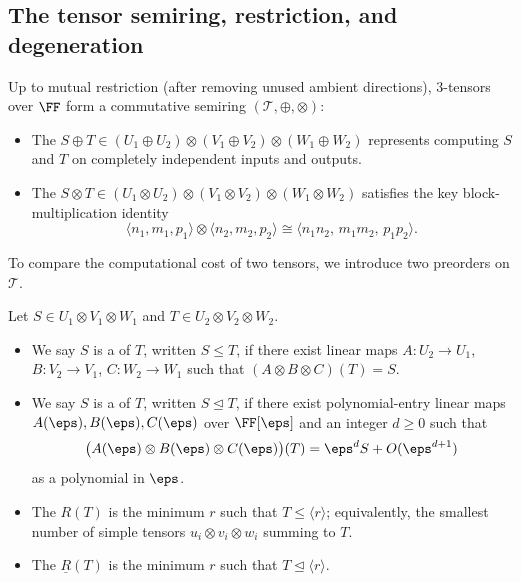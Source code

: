\subsection{The tensor semiring, restriction, and degeneration}

Up to mutual restriction (after removing unused ambient directions), \(3\)-tensors over \(\FF\) form a commutative semiring \((\mathcal{T}, \oplus, \otimes)\):
\begin{itemize}
  \item The  \(S \oplus T \in (U_1 \oplus U_2) \otimes (V_1 \oplus V_2) \otimes (W_1 \oplus W_2)\) represents computing \(S\) and \(T\) on completely independent inputs and outputs.
  \item The  \(S \otimes T \in (U_1 \otimes U_2) \otimes (V_1 \otimes V_2) \otimes (W_1 \otimes W_2)\) satisfies the key block-multiplication identity
  \[
    \langle n_1, m_1, p_1 \rangle \otimes \langle n_2, m_2, p_2 \rangle
    \cong \langle n_1 n_2,\, m_1 m_2,\, p_1 p_2 \rangle.
  \]
\end{itemize}

To compare the computational cost of two tensors, we introduce two preorders on \(\mathcal{T}\).

\begin{definition}
\label{def:mm-nine-fourths-preorders}
Let \(S \in U_1 \otimes V_1 \otimes W_1\) and \(T \in U_2 \otimes V_2 \otimes W_2\).
\begin{itemize}
  \item We say \(S\) is a  of \(T\), written \(S \le T\), if there exist linear maps \(A : U_2 \to U_1\), \(B : V_2 \to V_1\), \(C : W_2 \to W_1\) such that \((A \otimes B \otimes C)(T) = S\).
  \item We say \(S\) is a  of \(T\), written \(S \trianglelefteq T\), if there exist polynomial-entry linear maps \(A(\eps), B(\eps), C(\eps)\) over \(\FF[\eps]\) and an integer \(d \ge 0\) such that
  \[
    \bigl(A(\eps) \otimes B(\eps) \otimes C(\eps)\bigr)(T) = \eps^d S + O(\eps^{d+1})
  \]
  as a polynomial in \(\eps\).
  \item The  \(R(T)\) is the minimum \(r\) such that \(T \le \langle r \rangle\); equivalently, the smallest number of simple tensors \(u_i \otimes v_i \otimes w_i\) summing to \(T\).
  \item The  \(\underline{R}(T)\) is the minimum \(r\) such that \(T \trianglelefteq \langle r \rangle\).
\end{itemize}
\end{definition}

